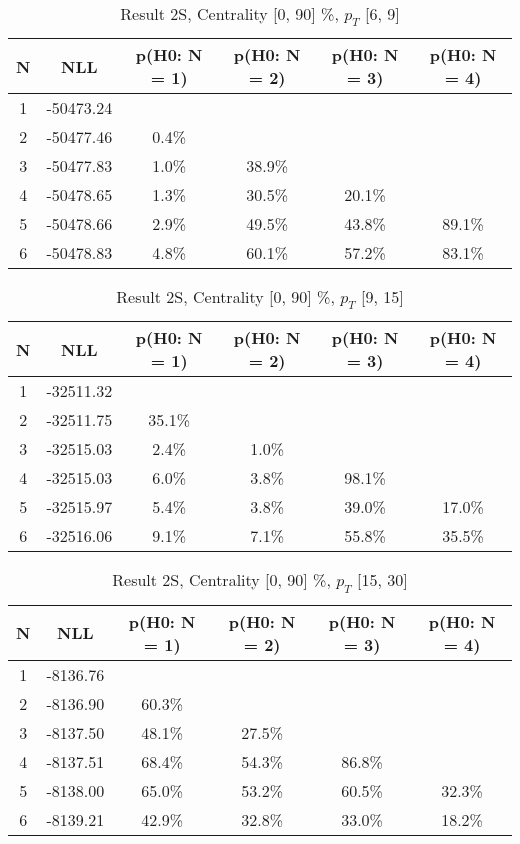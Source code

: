 \begin{table}[htb]
	\begin{center}
	\caption{Result 2S, Centrality [0, 90] \%, $p_{T}$ [6, 9] \GeV
}
{\footnotesize\renewcommand{\arraystretch}{1.4}
		\begin{tabular}{cc||cccc}
			N & NLL & p(H0: N = 1) & p(H0: N = 2) & p(H0: N = 3) & p(H0: N = 4)\\ 
		\hline
1 & -50473.24 & & & & \\
2 & -50477.46 & 0.4\% & & & \\
3 & -50477.83 & 1.0\% & 38.9\% & & \\
4 & -50478.65 & 1.3\% & 30.5\% & 20.1\% & \\
5 & -50478.66 & 2.9\% & 49.5\% & 43.8\% & 89.1\% \\
6 & -50478.83 & 4.8\% & 60.1\% & 57.2\% & 83.1\% \\
	\end{tabular}
		\label{tab:lab}
	}
	\end{center}\end{table}

\begin{table}[htb]
	\begin{center}
	\caption{Result 2S, Centrality [0, 90] \%, $p_{T}$ [9, 15] \GeV
}
{\footnotesize\renewcommand{\arraystretch}{1.4}
		\begin{tabular}{cc||cccc}
			N & NLL & p(H0: N = 1) & p(H0: N = 2) & p(H0: N = 3) & p(H0: N = 4)\\ 
		\hline
1 & -32511.32 & & & & \\
2 & -32511.75 & 35.1\% & & & \\
3 & -32515.03 & 2.4\% & 1.0\% & & \\
4 & -32515.03 & 6.0\% & 3.8\% & 98.1\% & \\
5 & -32515.97 & 5.4\% & 3.8\% & 39.0\% & 17.0\% \\
6 & -32516.06 & 9.1\% & 7.1\% & 55.8\% & 35.5\% \\
	\end{tabular}
		\label{tab:lab}
	}
	\end{center}\end{table}

\begin{table}[htb]
	\begin{center}
	\caption{Result 2S, Centrality [0, 90] \%, $p_{T}$ [15, 30] \GeV
}
{\footnotesize\renewcommand{\arraystretch}{1.4}
		\begin{tabular}{cc||cccc}
			N & NLL & p(H0: N = 1) & p(H0: N = 2) & p(H0: N = 3) & p(H0: N = 4)\\ 
		\hline
1 & -8136.76 & & & & \\
2 & -8136.90 & 60.3\% & & & \\
3 & -8137.50 & 48.1\% & 27.5\% & & \\
4 & -8137.51 & 68.4\% & 54.3\% & 86.8\% & \\
5 & -8138.00 & 65.0\% & 53.2\% & 60.5\% & 32.3\% \\
6 & -8139.21 & 42.9\% & 32.8\% & 33.0\% & 18.2\% \\
	\end{tabular}
		\label{tab:lab}
	}
	\end{center}\end{table}

